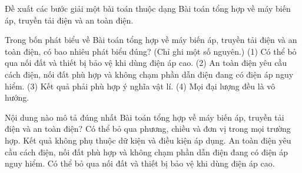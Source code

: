 \begin{bt}
Đề xuất các bước giải một bài toán thuộc dạng Bài toán tổng hợp về máy biến áp, truyền tải điện và an toàn điện.
\end{bt}

\begin{ex}
Trong bốn phát biểu về Bài toán tổng hợp về máy biến áp, truyền tải điện và an toàn điện, có bao nhiêu phát biểu đúng? (Chỉ ghi một số nguyên.) (1) Có thể bỏ qua nối đất và thiết bị bảo vệ khi dùng điện áp cao. (2) An toàn điện yêu cầu cách điện, nối đất phù hợp và không chạm phần dẫn điện đang có điện áp nguy hiểm. (3) Kết quả phải phù hợp ý nghĩa vật lí. (4) Mọi đại lượng đều là vô hướng.
\end{ex}

\begin{ex}
Nội dung nào mô tả đúng nhất Bài toán tổng hợp về máy biến áp, truyền tải điện và an toàn điện?
\choice
{Có thể bỏ qua phương, chiều và đơn vị trong mọi trường hợp.}
{Kết quả không phụ thuộc dữ kiện và điều kiện áp dụng.}
{\True An toàn điện yêu cầu cách điện, nối đất phù hợp và không chạm phần dẫn điện đang có điện áp nguy hiểm.}
{Có thể bỏ qua nối đất và thiết bị bảo vệ khi dùng điện áp cao.}
\end{ex}

